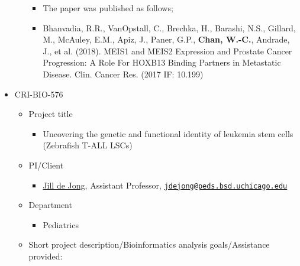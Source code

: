 \documentclass[]{article}
\providecommand{\tightlist}{%
  \setlength{\itemsep}{0pt}\setlength{\parskip}{0pt}}
\begin{document}
\begin{itemize}
\begin{itemize}
    \begin{itemize}
    \tightlist
    \item
      The paper was published as follows;
    \item
      Bhanvadia, R.R., VanOpstall, C., Brechka, H., Barashi, N.S.,
      Gillard, M., McAuley, E.M., Apiz, J., Paner, G.P., \textbf{Chan,
      W.-C.}, Andrade, J., et al. (2018). MEIS1 and MEIS2 Expression and
      Prostate Cancer Progression: A Role For HOXB13 Binding Partners in
      Metastatic Disease. Clin. Cancer Res. (2017 IF: 10.199)
    \end{itemize}
  \end{itemize}
\item
  CRI-BIO-576

  \begin{itemize}
  \tightlist
  \item
    Project title

    \begin{itemize}
    \tightlist
    \item
      Uncovering the genetic and functional identity of leukemia stem
      cells (Zebrafish T-ALL LSCs)
    \end{itemize}
  \item
    PI/Client

    \begin{itemize}
    \tightlist
    \item
      \href{https://www.uchicagomedicine.org/find-a-physician/physician/jill-de-jong}{Jill
      de Jong}, Assistant Professor,
      \href{mailto:jdejong@peds.bsd.uchicago.edu}{\nolinkurl{jdejong@peds.bsd.uchicago.edu}}
    \end{itemize}
  \item
    Department

    \begin{itemize}
    \tightlist
    \item
      Pediatrics
    \end{itemize}
  \item
    Short project description/Bioinformatics analysis goals/Assistance
    provided:


\end{itemize}
\end{itemize}
\end{document}
